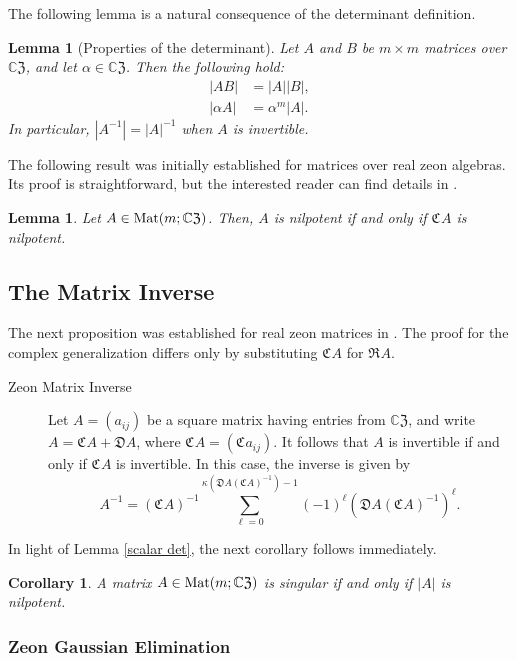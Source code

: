 \documentclass{article}
\newtheorem{lemma}[theorem]{Lemma}
\newtheorem{corollary}[theorem]{Corollary}
\theoremstyle{definition}
\newcommand{\zco}{\mathfrak{C}\mspace{1mu}}
\newcommand{\zre}{\mathfrak{R}\mspace{1mu}}
\newcommand{\CZ}{\mathbb{C}\mathfrak{Z}}
\newcommand{\Mat}{{\rm Mat}}
\numberwithin{equation}{section}
\begin{document}
The following lemma is a natural consequence of the determinant definition.

\begin{lemma}[Properties of the determinant]
Let $A$ and $B$ be $m\times m$ matrices over $\CZ$, and let $\alpha\in\CZ$.  Then the following hold:\begin{align*}
|AB|&=|A| |B|,\\
|\alpha A|&=\alpha^m |A|.
\end{align*}
In particular, $|A^{-1}|=|A|^{-1}$ when $A$ is invertible.
\end{lemma}

The following result was initially established for matrices over real zeon algebras.   Its proof is straightforward, but the interested reader can find details in \cite{zeon laplacian}. 

\begin{lemma}
Let $A\in\Mat(m;\CZ)$.  Then, $A$ is nilpotent if and only if $\zco A$ is nilpotent.
\end{lemma}


\subsection*{The Matrix Inverse}\label{matrix inverse}

The next proposition was established for real zeon matrices in \cite{zeon laplacian}.  The proof for the complex generalization differs only by substituting $\zco A$ for $\zre A$.

\begin{description}
\item [Zeon Matrix Inverse]
Let $A=(a_{ij})$ be a square matrix having entries from $\CZ$, and write $A=\zco A + \mathfrak{D}A$, where $\zco A=(\zco a_{ij})$.  It follows that $A$ is invertible if and only if $\zco A$ is invertible.  In this case, the inverse is given by \begin{equation*}
A^{-1}=(\zco A)^{-1}\sum_{\ell=0}^{\kappa(\mathfrak{D}A(\zco A)^{-1})-1}(-1)^\ell(\mathfrak{D}A(\zco A)^{-1})^{\ell}.
\end{equation*}
\end{description}

In light of Lemma \ref{scalar det}, the next corollary follows immediately.
\begin{corollary}
A matrix $A\in\Mat(m;\CZ)$ is singular if and only if $|A|$ is nilpotent.
\end{corollary}


\subsubsection*{Zeon Gaussian Elimination}
\end{document}
